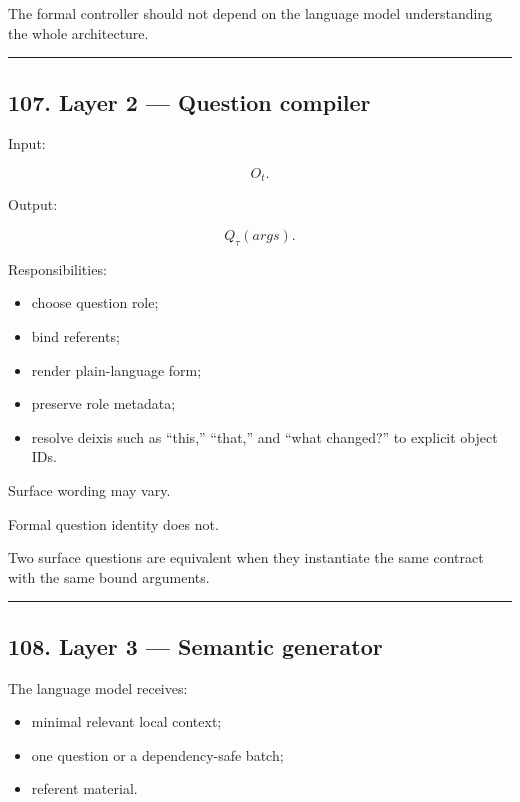 \documentclass[
]{article}
\providecommand{\tightlist}{%
  \setlength{\itemsep}{0pt}\setlength{\parskip}{0pt}}
\begin{document}
The formal controller should not depend on the language model
understanding the whole architecture.

\begin{center}\rule{0.5\linewidth}{0.5pt}\end{center}

\subsection{107. Layer 2 --- Question
compiler}\label{layer-2-question-compiler}

Input:

\[
O_t.
\]

Output:

\[
Q_\tau(args).
\]

Responsibilities:

\begin{itemize}
\tightlist
\item
  choose question role;
\item
  bind referents;
\item
  render plain-language form;
\item
  preserve role metadata;
\item
  resolve deixis such as ``this,'' ``that,'' and ``what changed?'' to
  explicit object IDs.
\end{itemize}

Surface wording may vary.

Formal question identity does not.

Two surface questions are equivalent when they instantiate the same
contract with the same bound arguments.

\begin{center}\rule{0.5\linewidth}{0.5pt}\end{center}

\subsection{108. Layer 3 --- Semantic
generator}\label{layer-3-semantic-generator}

The language model receives:

\begin{itemize}
\tightlist
\item
  minimal relevant local context;
\item
  one question or a dependency-safe batch;
\item
  referent material.
\end{itemize}
\end{document}
